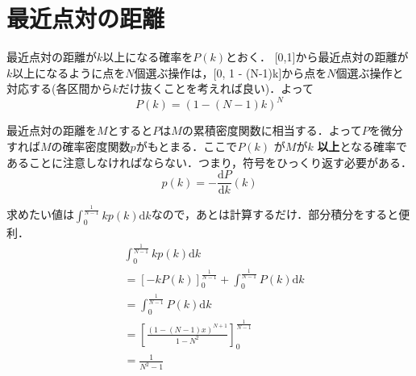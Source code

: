 \section{最近点対の距離}
最近点対の距離が$k$以上になる確率を$P(k)$とおく．
[0,1]から最近点対の距離が$k$以上になるように点を$N$個選ぶ操作は，[0, 1 - (N-1)k]から点を$N$個選ぶ操作と対応する(各区間から$k$だけ抜くことを考えれば良い)．よって
\[
P(k) = (1-(N-1)k)^N
\]

最近点対の距離を$M$とすると$P$は$M$の累積密度関数に相当する．よって$P$を微分すれば$M$の確率密度関数$p$がもとまる．ここで$P(k)$ が$M$が$k$ \textbf{以上}となる確率であることに注意しなければならない．つまり，符号をひっくり返す必要がある．
\[
p(k) = - \frac{\mathrm{d}P}{\mathrm{d}k}(k)
\]


求めたい値は$\int_0^{\frac{1}{N-1}} k p(k) \mathrm{d}k$なので，あとは計算するだけ．部分積分をすると便利．
\begin{align*}
  &\int_0^{\frac{1}{N-1}} k p(k) \mathrm{d}k\\
  &= \left [-k P(k)\right]_0^{\frac{1}{N-1}} + \int_0^{\frac{1}{N-1}} P(k) \mathrm{d}k\\
  &= \int_0^{\frac{1}{N-1}} P(k) \mathrm{d}k\\
  &= \left[ \frac{(1-(N-1)x)^{N+1}}{1-N^2} \right]_0^\frac{1}{N-1} \\
  &= \frac{1}{N^2-1}
\end{align*}
